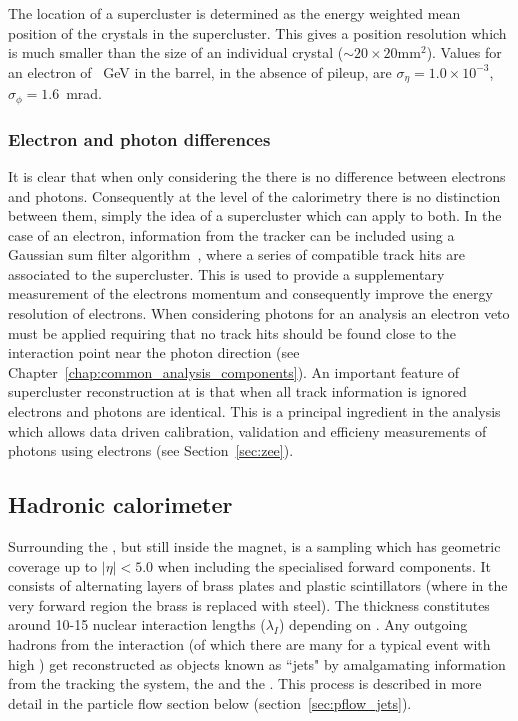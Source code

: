 The location of a supercluster is determined as the energy weighted mean position of the crystals in the supercluster. This gives a position resolution which is much smaller than the size of an individual crystal ($\sim20\times20$mm$^{2}$). Values for an electron of ~GeV in the \ECAL barrel, in the absence of pileup, are $\sigma_{\eta}=1.0\times10^{-3}$, $\sigma_{\phi}=1.6$~mrad.

\subsubsection{Electron and photon differences}

It is clear that when only considering the \ECAL there is no difference between electrons and photons. Consequently at the level of the calorimetry there is no distinction between them, simply the idea of a supercluster which can apply to both. In the case of an electron, information from the tracker can be included using a Gaussian sum filter algorithm~\cite{tracker_electron_reco}, where a series of compatible track hits are associated to the supercluster. This is used to provide a supplementary measurement of the electrons momentum and consequently improve the energy resolution of electrons. When considering photons for an analysis an electron veto must be applied requiring that no track hits should be found close to the interaction point near the photon direction (see Chapter~\ref{chap:common_analysis_components}). An important feature of supercluster reconstruction at \CMS is that when all track information is ignored electrons and photons are identical. This is a principal ingredient in the \Hgg analysis which allows data driven calibration, validation and efficieny measurements of photons using electrons (see Section~\ref{sec:zee}).

\subsection{Hadronic calorimeter}
\label{sec:hcal}

Surrounding the \ECAL, but still inside the magnet, is a sampling \HCAL which has geometric coverage up to $|\eta|<5.0$ when including the specialised forward components. It consists of alternating layers of brass plates and plastic scintillators (where in the very forward region the brass is replaced with steel). The \HCAL thickness constitutes around 10-15 nuclear interaction lengths ($\lambda_{I}$) depending on \eta. Any outgoing hadrons from the interaction (of which there are many for a typical event with high \ET) get reconstructed as objects known as ``jets" by amalgamating information from the tracking the system, the \ECAL and the \HCAL. This process is described in more detail in the particle flow section below (section~\ref{sec:pflow_jets}).  

